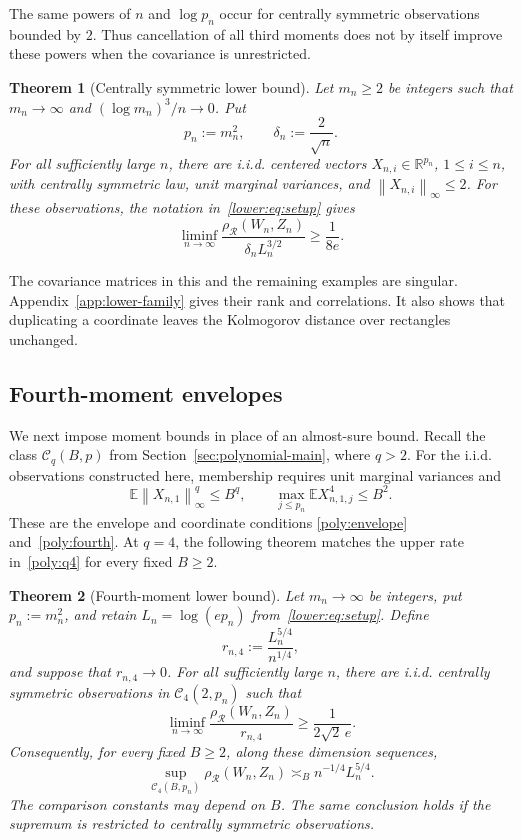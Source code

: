 \documentclass[11pt,letterpaper]{article}
\newtheorem{theorem}{Theorem}
\theoremstyle{remark}
\newcommand{\E}{\mathbb E}
\newcommand{\R}{\mathbb R}
\newcommand{\norm}[1]{\left\lVert#1\right\rVert}
\newcommand{\rh}{\rho_{\mathcal R}}
\begin{document}
The same powers of \(n\) and \(\log p_n\) occur for centrally
symmetric observations bounded by \(2\). Thus cancellation of all
third moments does not by itself improve these powers when the
covariance is unrestricted.

\begin{theorem}[Centrally symmetric lower bound]\label{opt:symmetric-lower}
Let \(m_n\ge2\) be integers such that \(m_n\to\infty\) and
\((\log m_n)^3/n\to0\). Put
\[
 p_n:=m_n^2,\qquad \delta_n:=\frac2{\sqrt n}.
\]
For all sufficiently large \(n\), there are i.i.d. centered vectors
\(X_{n,i}\in\R^{p_n}\), \(1\le i\le n\), with centrally symmetric
law, unit marginal variances, and \(\norm{X_{n,i}}_\infty\le2\).
For these observations, the notation in~\eqref{lower:eq:setup} gives
\[
 \liminf_{n\to\infty}
 \frac{\rh(W_n,Z_n)}{\delta_nL_n^{3/2}}\ge\frac1{8e}.
\]
\end{theorem}

The covariance matrices in this and the remaining examples are
singular. Appendix~\ref{app:lower-family} gives their rank and
correlations. It also shows that duplicating a coordinate leaves
the Kolmogorov distance over rectangles unchanged.

\subsection{Fourth-moment envelopes}\label{opt:q4-comparison}

We next impose moment bounds in place of an almost-sure bound.
Recall the class \(\mathcal C_q(B,p)\) from Section~\ref{sec:polynomial-main},
where \(q>2\). For the i.i.d. observations constructed here,
membership requires unit marginal variances and
\[
 \E\norm{X_{n,1}}_\infty^q\le B^q,\qquad
 \max_{j\le p_n}\E X_{n,1,j}^4\le B^2.
\]
These are the envelope and coordinate conditions
\eqref{poly:envelope} and~\eqref{poly:fourth}.
At \(q=4\), the following theorem matches the upper rate
in~\eqref{poly:q4} for every fixed \(B\ge2\).

\begin{theorem}[Fourth-moment lower bound]\label{opt:q4-lower}
Let \(m_n\to\infty\) be integers, put \(p_n:=m_n^2\), and
retain \(L_n=\log(ep_n)\) from~\eqref{lower:eq:setup}. Define
\[
 r_{n,4}:=\frac{L_n^{5/4}}{n^{1/4}},
\]
and suppose that \(r_{n,4}\to0\).
For all sufficiently large \(n\), there are i.i.d. centrally
symmetric observations in \(\mathcal C_4(2,p_n)\) such that
\begin{equation}
 \liminf_{n\to\infty}
 \frac{\rh(W_n,Z_n)}{r_{n,4}}\ge\frac1{2\sqrt2\,e}.
 \label{opt:eq:q4-lower}
\end{equation}
Consequently, for every fixed \(B\ge2\), along these dimension sequences,
\begin{equation}
 \sup_{\mathcal C_4(B,p_n)}\rh(W_n,Z_n)
 \asymp_B n^{-1/4}L_n^{5/4}.
 \label{lower:q4-fixed}
\end{equation}
The comparison constants may depend on \(B\). The same conclusion holds
if the supremum is restricted to centrally symmetric observations.
\end{theorem}
\end{document}
